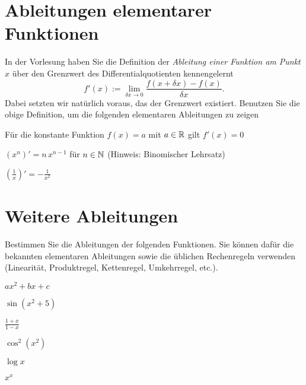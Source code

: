\documentclass{scrartcl}
\begin{document}
\maketitle


\section{Ableitungen elementarer Funktionen }
\label{sec:ableitungen_elementarer_funktionen}


In der Vorlesung haben Sie die Definition der \emph{Ableitung einer Funktion am Punkt $x$} über den Grenzwert des Differentialquotienten kennengelernt
\[
  f'(x) := \lim_{\delta x \to 0}  \frac{f(x + \delta x) - f(x)}{\delta x}.
\] 
Dabei setzten wir natürlich voraus, das der Grenzwert existiert.
Benutzen Sie die obige Definition, um die folgenden elementaren Ableitungen zu zeigen

\begin{subex}
  \item{} Für die konstante Funktion $f(x) = a$ mit $a \in \mathbb{R}$ gilt $f'(x) = 0$
  \item{} $\left( x^n \right)' = n \, x^{n-1}$ für $n \in \mathbb{N}$ (Hinweis: Binomischer Lehrsatz)
  \item{} $\left( \frac{1}{x} \right)' = -\frac{1}{x^2}$
\end{subex}


\section{Weitere Ableitungen }
\label{sec:weitere_ableitungen}

Bestimmen Sie die Ableitungen der folgenden Funktionen.
Sie können dafür die bekannten elementaren Ableitungen sowie die üblichen Rechenregeln verwenden (Linearität, Produktregel, Kettenregel, Umkehrregel, etc.).

\begin{subex*}
  \item $a x^2 + b x + c$
  \item $\sin (x^2 + 5)$
  \item $\frac{1 + x}{1 - x}$
  \item $\cos^2 (x^2)$
  \item $\log x$
  \item $x^x$
\end{subex*}
\end{document}
